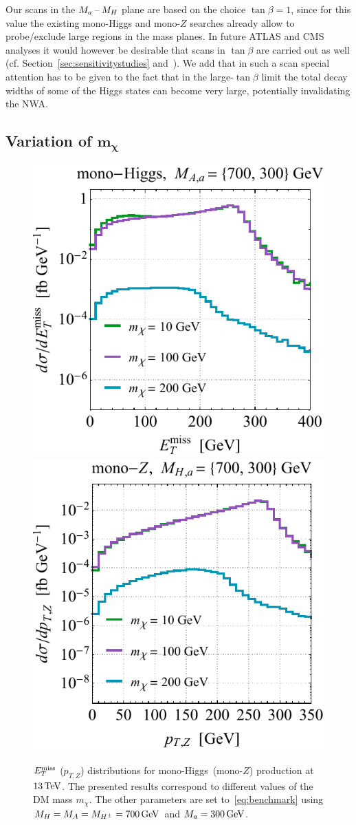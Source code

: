 Our  scans in the $M_{a}\hspace{0.5mm}$--$\hspace{0.5mm} M_H$ plane are based on the choice $\tan \beta = 1$, since for this value the existing mono-Higgs and mono-$Z$ searches already allow to probe/exclude large regions in the mass planes. In  future ATLAS and CMS analyses it would however be desirable that scans in $\tan \beta$ are carried out as well (cf. Section~\ref{sec:sensitivitystudies} and~\cite{No:2015xqa,Bauer:2017ota,Pani:2017qyd}). We add that in such a scan special attention has to be given to the fact that in the large-$\tan \beta$ limit the total decay widths of some of the Higgs states can become very large, potentially invalidating the NWA.

\subsection*{Variation of $\bm{m_\chi}$}

\begin{figure}[t!]
\centering
\includegraphics[height=0.45\textwidth]{texinputs/04_grid/newfigures/mdml.pdf} \qquad 
\includegraphics[height=0.45\textwidth]{texinputs/04_grid/newfigures/mdmr.pdf}
\vspace{2mm}
\caption{\label{fig:mdmvar} $E_T^\mathrm{miss}$ ($p_{T,Z}$) distributions for mono-Higgs~(mono-$Z$) production at $13 \, {\rm TeV}$. The presented results correspond to different values of the DM mass $m_\chi$. The other \hdma parameters are set to~\eqref{eq:benchmark} using $M_{H} = M_{A} = M_{H^{\pm}} = 700 \, {\rm GeV}$ and $M_{a} = 300 \, {\rm GeV}$. }
\end{figure}

